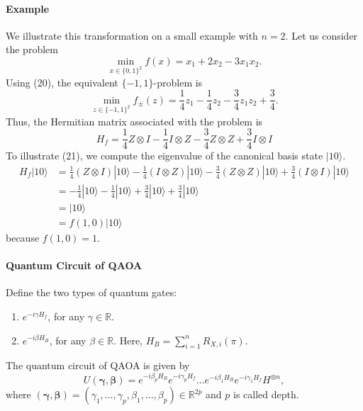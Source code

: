 \documentclass[
        11pt, %
	a4paper, %
]{LegrandOrangeBook}
\begin{document}

\paragraph{Example}
We illustrate this transformation on a small example with $n=2$. Let us consider the problem
\begin{equation}
    \min _{x \in\{0,1\}^{2}} f(x)=x_{1}+2 x_{2}-3 x_{1} x_{2}.
\end{equation}
Using (20), the equivalent $\{-1,1\}$-problem is
\begin{equation}
    \min _{z \in\{-1,1\}^{2}} f_{ \pm}(z)=\frac{1}{4} z_{1}-\frac{1}{4} z_{2}-\frac{3}{4} z_{1} z_{2}+\frac{3}{4}.
\end{equation}
Thus, the Hermitian matrix associated with the problem is
\begin{equation}
    H_{f}=\frac{1}{4} Z \otimes I-\frac{1}{4} I \otimes Z-\frac{3}{4} Z \otimes Z+\frac{3}{4} I \otimes I
\end{equation}
To illustrate (21), we compute the eigenvalue of the canonical basis state $|10\rangle$.
\begin{equation}
\begin{aligned}
H_{f}|10\rangle & =\frac{1}{4}(Z \otimes I)|10\rangle-\frac{1}{4}(I \otimes Z)|10\rangle-\frac{3}{4}(Z \otimes Z)|10\rangle+\frac{3}{4}(I \otimes I)|10\rangle \\
& =-\frac{1}{4}|10\rangle-\frac{1}{4}|10\rangle+\frac{3}{4}|10\rangle+\frac{3}{4}|10\rangle \\
& =|10\rangle \\
& =f(1,0)|10\rangle
\end{aligned}
\end{equation}
because $f(1,0)=1$.

\paragraph{Quantum Circuit of QAOA}
Define the two types of quantum gates:
\begin{enumerate}
    \item $e^{-i  \gamma H_{f}}$, for any $\gamma \in \mathbb{R}$.
    \item $e^{-i \beta  H_{B} }$, for any $\beta \in \mathbb{R}$. Here, $H_{B}=\sum_{i=1}^{n} R_{X, i}(\pi).$
\end{enumerate}
The quantum circuit of QAOA is given by
\begin{equation}
    U(\boldsymbol{\gamma}, \boldsymbol{\beta})
= e^{-i \beta_p H_B} e^{-i \gamma_p H_{f}} \ldots e^{-i \beta_1 H_B} e^{-i \gamma_1 H_{f}} H^{\otimes n},
\end{equation}
where $(\boldsymbol{\gamma}, \boldsymbol{\beta})=\left(\gamma_{1}, \ldots, \gamma_{p}, \beta_{1}, \ldots, \beta_{p}\right) \in \mathbb{R}^{2 p}$ and $p$ is called depth.
\end{document}
